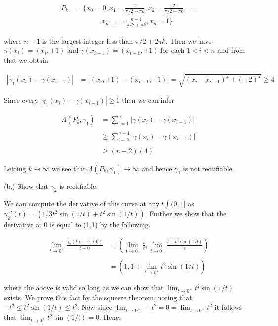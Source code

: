 \documentclass{article}
\begin{document}
  \begin{align*}
    P_k&=\bigg\{x_0=0,x_{1}=\frac{1}{\pi/2 + \pi k}, x_2=\frac{2}{\pi/2 + \pi k}, \dots, \\
    &\qquad \qquad x_{n-1}=\frac{n-1}{\pi/2 +\pi k},x_n=1\bigg\}
  \end{align*} 

  where $n-1$ is the largest integer less than $\pi/2+2\pi k$.  Then we have $\gamma(x_i)=(x_i,\pm 1)$ and $\gamma(x_{i-1})=(x_{i-1},\mp 1)$ for each $1 < i < n$ and from that we obtain 

  \begin{align*}
    |\gamma_1(x_i)-\gamma(x_{i-1})| &= |(x_i,\pm 1)-(x_{i-1},\mp 1)| = \sqrt{(x_i-x_{i-1})^2+(\pm 2)^2} \geq 4
  \end{align*}

  Since every $|\gamma_1(x_i)-\gamma(x_{i-1})|\geq 0$ then we can infer 

  \begin{align*}
    \Lambda (P_k,\gamma_1) &= \sum_{i=1}^{n}|\gamma(x_i)-\gamma(x_{i-1})| \\\\
    &\geq \sum_{i=2}^{n-1}|\gamma(x_i)-\gamma(x_{i-1})| \\\\
    &\geq (n-2)(4)
  \end{align*}

  Letting $k\to \infty$ we see that $\Lambda(P_k,\gamma_1) \to \infty$ and hence $\gamma_1$ is not rectifiable.  

  \vspace{1cm}

  {\Large\color{Sepia} (b.) Show that $\gamma_2$ is rectifiable.}

  \vspace{1cm}

  We can compute the derivative of this curve at any $t\int (0,1]$ as $\gamma_2'(t) = (1,3t^2\sin(1/t) + t^2\sin(1/t))$.  Further we show that the derivative at 0 is equal to (1,1) by the following.

  \begin{align*}
    \lim_{t\to 0^+} \frac{\gamma_2(t)-\gamma_2(0)}{t-0} &= \left( \lim_{t\to 0^+}\frac t t, \lim_{t\to 0^+}\frac{t+t^3\sin(1/t)}{t}\right) \\\\
    &= \left(1, 1+\lim_{t\to 0^+ } t^2\sin(1/t)\right)
  \end{align*}

  where the above is valid so long as we can show that $\displaystyle\lim_{t\to 0^+}t^2\sin(1/t)$ exists. We prove this fact by the squeeze theorem, noting that $-t^2 \leq t^2 \sin (1/t) \le t^2$.  Now since $\displaystyle\lim_{t\to 0^+}-t^2 = 0 = \lim_{t\to 0^+} t^2$ it follows that $\displaystyle\lim_{t\to 0^+}t^2\sin(1/t)=0$.  Hence 
\end{document}

